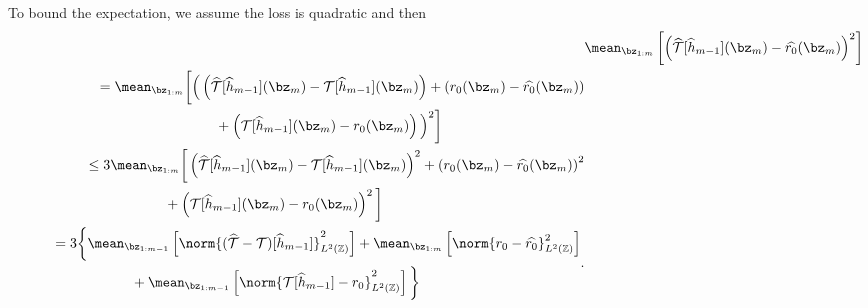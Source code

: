 To bound the expectation, we assume the loss is quadratic and then
\begin{align*}
    &\mean_{ \bz_{ 1:m } } \left[
        \left(
            \hat{ \mathcal{T} } [ \hat{ h }_{ m-1 } ] ( \bz_{ m } )
            - \hat{ r_{ 0 } } ( \bz_{ m } )
        \right)^2
    \right] \\
    \begin{split}
        &\hspace{1cm}
        = \mean_{ \bz_{ 1:m } } \bigg[
            \Big(
                \left(
                    \hat{ \mathcal{T} } [ \hat{ h }_{ m-1 } ] ( \bz_{ m } )
                    - \mathcal{T} [ \hat{ h }_{ m-1 } ] ( \bz_{ m } )
                \right)
                + \left(
                    r_{ 0 } ( \bz_{ m } )
                    - \hat{ r_{ 0 } } ( \bz_{ m } )
                \right) \\
        &\hspace{4cm}
                + \left(
                    \mathcal{T} [ \hat{ h }_{ m-1 } ] ( \bz_{ m } )
                    - r_{ 0 } ( \bz_{ m } )
                \right)
            \Big)^2
        \bigg]
    \end{split} \\
    \begin{split}
        &\hspace{1cm}
        \leq 3 \mean_{ \bz_{ 1:m } } \bigg[
            \left(
                \hat{ \mathcal{T} } [ \hat{ h }_{ m-1 } ] ( \bz_{ m } )
                - \mathcal{T} [ \hat{ h }_{ m-1 } ] ( \bz_{ m } )
            \right)^2
            + \left(
                r_{ 0 } ( \bz_{ m } )
                - \hat{ r_{ 0 } } ( \bz_{ m } )
            \right)^2 \\
    &\hspace{3cm}
            + \left(
                \mathcal{T} [ \hat{ h }_{ m-1 } ] ( \bz_{ m } )
                - r_{ 0 } ( \bz_{ m } )
            \right)^2
        \bigg]
    \end{split} \\
    \begin{split}
        &\hspace{1cm}
        = 3 \bigg\{
            \mean_{ \bz_{ 1:m-1 } }\left[
                \norm{
                ( \hat{ \mathcal{T} } - \mathcal{T} )
                [ \hat{ h }_{ m-1 } ]
            }_{ L^2 ( \mathbb{Z} ) }^2
            \right]
            + \mean_{ \bz_{ 1:m } } \left[
                \norm{ r_{ 0 } - \hat{ r_{ 0 } } }_{ L^2 ( \mathbb{Z} ) }^2
            \right]\\
        &\hspace{3cm}
            + \mean_{ \bz_{ 1:m-1 } }  \left[
                \norm{ \mathcal{T} [ \hat{ h }_{ m-1 } ] - r_{ 0 } }_{ L^2 ( \mathbb{Z} ) }^2
            \right]
        \bigg\}
    \end{split}
.\end{align*}
